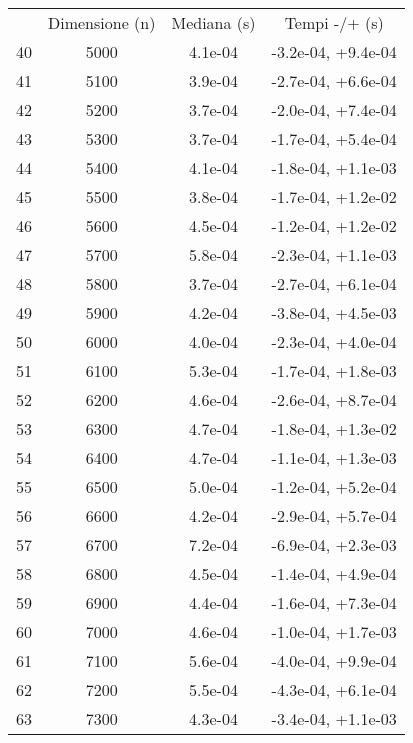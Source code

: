 \begin{table}
\centering
\begin{adjustbox}{width=1\textwidth/2}
\begin{tabular}{|c|c|c|c|}
\hline
 & Dimensione (n) & Mediana (s) & Tempi -/+ (s) \\
40 & 5000 & 4.1e-04 & -3.2e-04, +9.4e-04 \\
\cline{1-4}
41 & 5100 & 3.9e-04 & -2.7e-04, +6.6e-04 \\
\cline{1-4}
42 & 5200 & 3.7e-04 & -2.0e-04, +7.4e-04 \\
\cline{1-4}
43 & 5300 & 3.7e-04 & -1.7e-04, +5.4e-04 \\
\cline{1-4}
44 & 5400 & 4.1e-04 & -1.8e-04, +1.1e-03 \\
\cline{1-4}
45 & 5500 & 3.8e-04 & -1.7e-04, +1.2e-02 \\
\cline{1-4}
46 & 5600 & 4.5e-04 & -1.2e-04, +1.2e-02 \\
\cline{1-4}
47 & 5700 & 5.8e-04 & -2.3e-04, +1.1e-03 \\
\cline{1-4}
48 & 5800 & 3.7e-04 & -2.7e-04, +6.1e-04 \\
\cline{1-4}
49 & 5900 & 4.2e-04 & -3.8e-04, +4.5e-03 \\
\cline{1-4}
50 & 6000 & 4.0e-04 & -2.3e-04, +4.0e-04 \\
\cline{1-4}
51 & 6100 & 5.3e-04 & -1.7e-04, +1.8e-03 \\
\cline{1-4}
52 & 6200 & 4.6e-04 & -2.6e-04, +8.7e-04 \\
\cline{1-4}
53 & 6300 & 4.7e-04 & -1.8e-04, +1.3e-02 \\
\cline{1-4}
54 & 6400 & 4.7e-04 & -1.1e-04, +1.3e-03 \\
\cline{1-4}
55 & 6500 & 5.0e-04 & -1.2e-04, +5.2e-04 \\
\cline{1-4}
56 & 6600 & 4.2e-04 & -2.9e-04, +5.7e-04 \\
\cline{1-4}
57 & 6700 & 7.2e-04 & -6.9e-04, +2.3e-03 \\
\cline{1-4}
58 & 6800 & 4.5e-04 & -1.4e-04, +4.9e-04 \\
\cline{1-4}
59 & 6900 & 4.4e-04 & -1.6e-04, +7.3e-04 \\
\cline{1-4}
60 & 7000 & 4.6e-04 & -1.0e-04, +1.7e-03 \\
\cline{1-4}
61 & 7100 & 5.6e-04 & -4.0e-04, +9.9e-04 \\
\cline{1-4}
62 & 7200 & 5.5e-04 & -4.3e-04, +6.1e-04 \\
\cline{1-4}
63 & 7300 & 4.3e-04 & -3.4e-04, +1.1e-03 \\

\end{tabular}
\end{adjustbox}
\end{table}
